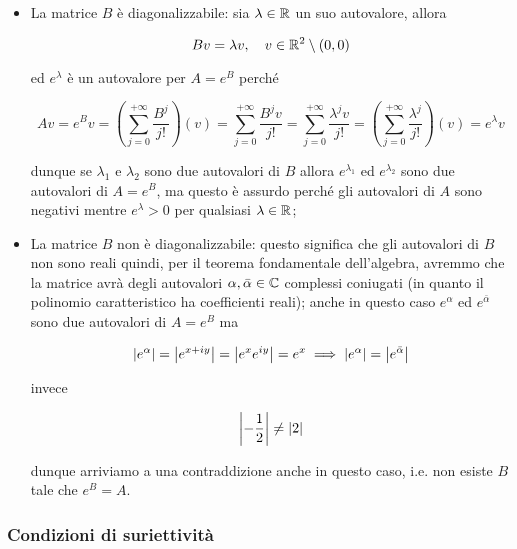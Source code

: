 \begin{itemize}
	\item La matrice $ B $ è diagonalizzabile: sia $ \lambda \in \mathbb{R} $ un suo autovalore, allora
	
	\begin{equation}
		B v = \lambda v \qcomma v \in \R^{2} \setminus {(0,0)}
	\end{equation}

	ed $ e^{\lambda} $ è un autovalore per $ A = e^{B} $ perché
	
	\begin{equation}
		A v = e^{B} v %
		= \left( \sum_{j=0}^{+\infty} \dfrac{B^{j}}{j!} \right) (v) %
		= \sum_{j=0}^{+\infty} \dfrac{B^{j} v}{j!} %
		= \sum_{j=0}^{+\infty} \dfrac{\lambda^{j} v}{j!} %
		= \left( \sum_{j=0}^{+\infty} \dfrac{\lambda^{j}}{j!} \right) (v) %
		= e^{\lambda} v
	\end{equation}

	dunque se $ \lambda_{1} $ e $ \lambda_{2} $ sono due autovalori di $ B $ allora $ e^{\lambda_{1}} $ ed $ e^{\lambda_{2}} $ sono due autovalori di $ A = e^{B} $, ma questo è assurdo perché gli autovalori di $ A $ sono negativi mentre $ e^{\lambda} > 0 $ per qualsiasi $ \lambda \in \mathbb{R} $;
	
	\item La matrice $ B $ non è diagonalizzabile: questo significa che gli autovalori di $ B $ non sono reali quindi, per il teorema fondamentale dell'algebra, avremmo che la matrice avrà degli autovalori $ \alpha, \bar{\alpha} \in \mathbb{C} $ complessi coniugati (in quanto il polinomio caratteristico ha coefficienti reali); anche in questo caso $ e^{\alpha} $ ed $ e^{\bar{\alpha}} $ sono due autovalori di $ A = e^{B} $ ma
	
	\begin{equation}
		\abs{e^{\alpha}} = \abs{e^{x + i y}} = \abs{e^{x} e^{i y}} = e^{x} %
		\implies %
		\abs{e^{\alpha}} = \abs{e^{\bar{\alpha}}}
	\end{equation}

	invece
	
	\begin{equation}
		\abs{- \dfrac{1}{2}} \neq \abs{2}
	\end{equation}

	dunque arriviamo a una contraddizione anche in questo caso, i.e. non esiste $ B $ tale che $ e^{B} = A $.
\end{itemize}

\subsubsection{Condizioni di suriettività}

